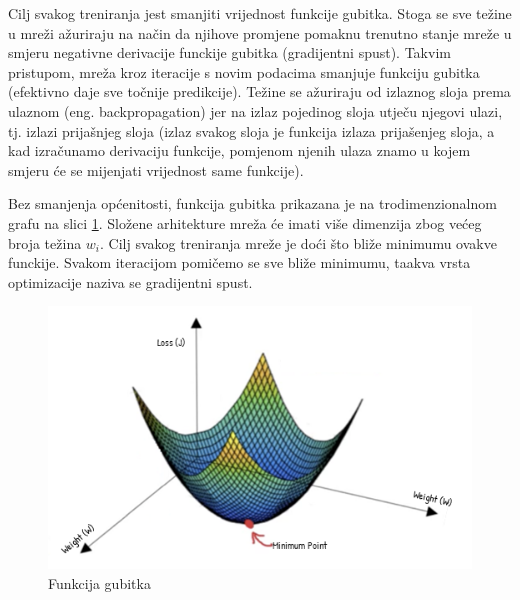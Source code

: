 

Cilj svakog treniranja jest smanjiti vrijednost funkcije gubitka. Stoga se sve težine u mreži
ažuriraju na način da njihove promjene pomaknu trenutno stanje mreže u smjeru negativne derivacije
funckije gubitka (gradijentni spust). Takvim pristupom, mreža kroz iteracije s novim podacima smanjuje funkciju gubitka
(efektivno daje sve točnije predikcije). Težine se ažuriraju od izlaznog sloja prema ulaznom 
(eng. backpropagation) jer na izlaz pojedinog sloja utječu njegovi ulazi, tj. izlazi prijašnjeg
sloja (izlaz svakog sloja je funkcija izlaza prijašenjeg sloja, a kad izračunamo derivaciju
funkcije, pomjenom njenih ulaza znamo u kojem smjeru će se mijenjati vrijednost same funkcije).



Bez smanjenja općenitosti, funkcija gubitka prikazana je na trodimenzionalnom grafu
na slici \ref{pic:descent}. Složene arhitekture mreža će imati više dimenzija zbog većeg broja
težina \( w_i \). Cilj svakog treniranja mreže je doći što bliže minimumu ovakve funckije.
Svakom iteracijom pomičemo se sve bliže minimumu, taakva vrsta optimizacije naziva se
gradijentni spust.

\begin{figure}[htb]
  \centering
  \includegraphics[width=0.5\linewidth]{Chapters/neuronska_mreza/descent.png} 
  \caption{Funkcija gubitka \cite{desc}}
  \label{pic:descent}
\end{figure}






